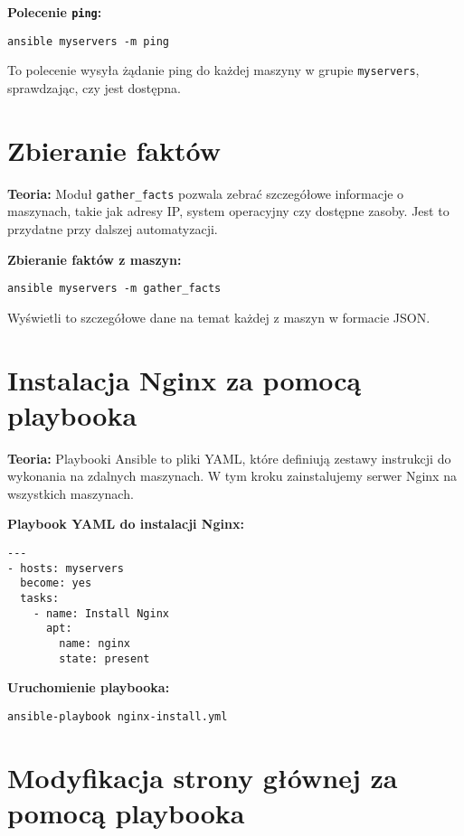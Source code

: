 \documentclass{article}
\begin{document}
\textbf{Polecenie \texttt{ping}:}

\noindent\begin{lstlisting}
ansible myservers -m ping
\end{lstlisting}

To polecenie wysyła żądanie ping do każdej maszyny w grupie \texttt{myservers}, sprawdzając, czy jest dostępna.

\section{Zbieranie faktów}

\textbf{Teoria:}  
Moduł \texttt{gather\_facts} pozwala zebrać szczegółowe informacje o maszynach, takie jak adresy IP, system operacyjny czy dostępne zasoby. Jest to przydatne przy dalszej automatyzacji.

\textbf{Zbieranie faktów z maszyn:}

\noindent\begin{lstlisting}
ansible myservers -m gather_facts
\end{lstlisting}

Wyświetli to szczegółowe dane na temat każdej z maszyn w formacie JSON.

\section{Instalacja Nginx za pomocą playbooka}

\textbf{Teoria:}  
Playbooki Ansible to pliki YAML, które definiują zestawy instrukcji do wykonania na zdalnych maszynach. W tym kroku zainstalujemy serwer Nginx na wszystkich maszynach.

\textbf{Playbook YAML do instalacji Nginx:}

\noindent\begin{lstlisting}
---
- hosts: myservers
  become: yes
  tasks:
    - name: Install Nginx
      apt:
        name: nginx
        state: present
\end{lstlisting}

\textbf{Uruchomienie playbooka:}

\noindent\begin{lstlisting}
ansible-playbook nginx-install.yml
\end{lstlisting}

\section{Modyfikacja strony głównej za pomocą playbooka}
\end{document}
